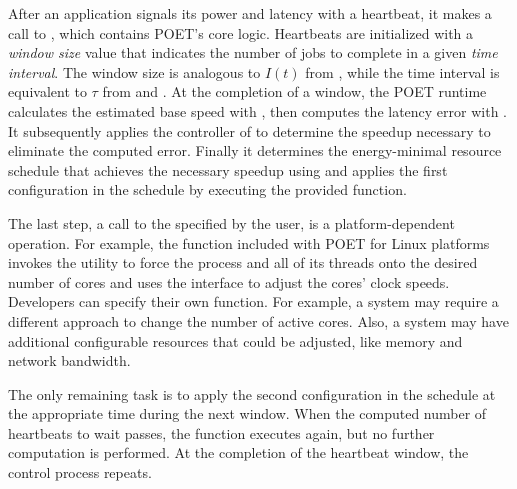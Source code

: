 After an application signals its power and latency with a heartbeat, it makes a call to , which contains POET's core logic.
Heartbeats are initialized with a {\em window size} value that indicates the number of jobs to complete in a given {\em time interval}.
The window size is analogous to $I(t)$ from , while the time interval is equivalent to $\tau$ from  and .
At the completion of a window, the POET runtime calculates the estimated base speed with , then computes the latency error with .
It subsequently applies the controller of  to determine the speedup necessary to eliminate the computed error.
Finally it determines the energy-minimal resource schedule that achieves the necessary speedup using  and applies the first configuration in the schedule by executing the provided  function.

The last step, a call to the  specified by the user, is a platform-dependent operation.
For example, the function included with POET for Linux platforms invokes the  utility to force the process and all of its threads onto the desired number of cores and uses the  interface to adjust the cores' clock speeds.
Developers can specify their own function.
For example, a system may require a different approach to change the number of active cores.
Also, a system may have additional configurable resources that could be adjusted, like memory and network bandwidth.

The only remaining task is to apply the second configuration in the schedule at the appropriate time during the next window.
When the computed number of heartbeats to wait passes, the  function executes again, but no further computation is performed.
At the completion of the heartbeat window, the control process repeats.

